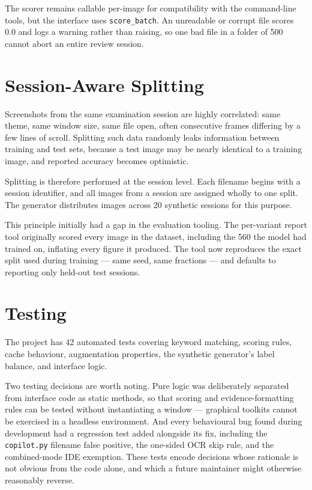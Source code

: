 \documentclass[12pt,oneside]{report}
\newcommand{\code}[1]{\texttt{\small #1}}
\begin{document}
The scorer remains callable per-image for compatibility with the command-line
tools, but the interface uses \code{score\_batch}. An unreadable or corrupt file
scores 0.0 and logs a warning rather than raising, so one bad file in a folder
of 500 cannot abort an entire review session.

\section{Session-Aware Splitting}
\label{sec:splitting}

Screenshots from the same examination session are highly correlated: same
theme, same window size, same file open, often consecutive frames differing by
a few lines of scroll. Splitting such data randomly leaks information between
training and test sets, because a test image may be nearly identical to a
training image, and reported accuracy becomes optimistic.

Splitting is therefore performed at the session level. Each filename begins
with a session identifier, and all images from a session are assigned wholly to
one split. The generator distributes images across 20 synthetic sessions for
this purpose.

This principle initially had a gap in the evaluation tooling. The per-variant
report tool originally scored every image in the dataset, including the 560 the
model had trained on, inflating every figure it produced. The tool now
reproduces the exact split used during training --- same seed, same fractions
--- and defaults to reporting only held-out test sessions.

\section{Testing}
\label{sec:testing}

The project has 42 automated tests covering keyword matching, scoring rules,
cache behaviour, augmentation properties, the synthetic generator's label
balance, and interface logic.

Two testing decisions are worth noting. Pure logic was deliberately separated
from interface code as static methods, so that scoring and evidence-formatting
rules can be tested without instantiating a window --- graphical toolkits
cannot be exercised in a headless environment. And every behavioural bug found
during development had a regression test added alongside its fix, including the
\code{copilot.py} filename false positive, the one-sided OCR skip rule, and the
combined-mode IDE exemption. These tests encode decisions whose rationale is
not obvious from the code alone, and which a future maintainer might otherwise
reasonably reverse.
\end{document}
